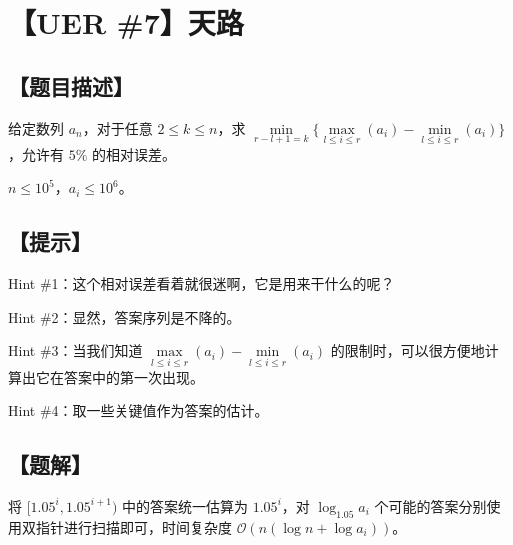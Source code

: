 \documentclass[UTF8,12pt,a4paper]{ctexart} %
\begin{document}
	\fontsize{12pt}{12pt}\selectfont
	
	\newpage
	\pagestyle{fancy}
	
	\section*{【UER \#7】天路}
	
	\subsection*{【题目描述】}
	
	给定数列 $a_n$，对于任意 $2\le k\le n$，求 $\min\limits_{r-l+1=k}\{\max\limits_{l\le i\le r}(a_i)-\min\limits_{l\le i\le r}(a_i)\}$，允许有 $5\%$ 的相对误差。
	
	$n\le10^5$，$a_i\le10^6$。
	
	\subsection*{【提示】}
	
	Hint \#1：这个相对误差看着就很迷啊，它是用来干什么的呢？
	
	Hint \#2：显然，答案序列是不降的。
	
	Hint \#3：当我们知道 $\max\limits_{l\le i\le r}(a_i)-\min\limits_{l\le i\le r}(a_i)$ 的限制时，可以很方便地计算出它在答案中的第一次出现。
	
	Hint \#4：取一些关键值作为答案的估计。
	
	\subsection*{【题解】}
	
	将 $[1.05^{i},1.05^{i+1})$ 中的答案统一估算为 $1.05^i$，对 $\log_{1.05}{a_i}$ 个可能的答案分别使用双指针进行扫描即可，时间复杂度 $\mathcal{O}(n(\log n+\log a_i))$。
	
	
\end{document}
